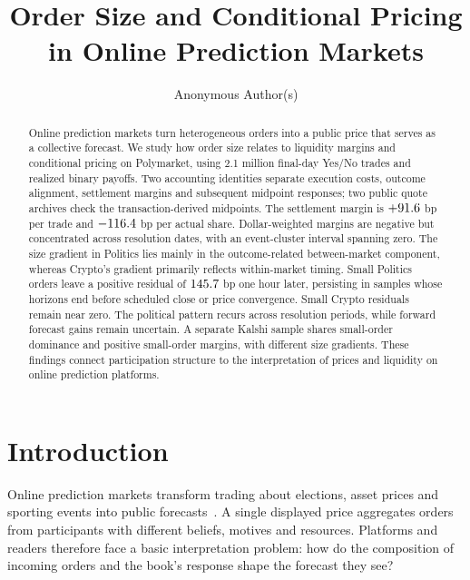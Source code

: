 \documentclass[sigconf,anonymous,nonacm,balance=false]{acmart}
\begin{document}
\title{Order Size and Conditional Pricing in Online Prediction Markets}
\author{Anonymous Author(s)}
\renewcommand{\shortauthors}{Anon.}

\begin{abstract}
Online prediction markets turn heterogeneous orders into a public price that serves as a collective forecast. We study how order size relates to liquidity margins and conditional pricing on Polymarket, using 2.1 million final-day Yes/No trades and realized binary payoffs. Two accounting identities separate execution costs, outcome alignment, settlement margins and subsequent midpoint responses; two public quote archives check the transaction-derived midpoints. The settlement margin is $+91.6$ bp per trade and $-116.4$ bp per actual share. Dollar-weighted margins are negative but concentrated across resolution dates, with an event-cluster interval spanning zero. The size gradient in Politics lies mainly in the outcome-related between-market component, whereas Crypto's gradient primarily reflects within-market timing. Small Politics orders leave a positive residual of $145.7$ bp one hour later, persisting in samples whose horizons end before scheduled close or price convergence. Small Crypto residuals remain near zero. The political pattern recurs across resolution periods, while forward forecast gains remain uncertain. A separate Kalshi sample shares small-order dominance and positive small-order margins, with different size gradients. These findings connect participation structure to the interpretation of prices and liquidity on online prediction platforms.

\end{abstract}

\maketitle

\section{Introduction}
Online prediction markets transform trading about elections, asset prices and sporting events into public forecasts~\cite{wolfers2004prediction,arrow2008promise}. A single displayed price aggregates orders from participants with different beliefs, motives and resources. Platforms and readers therefore face a basic interpretation problem: how do the composition of incoming orders and the book's response shape the forecast they see?
\end{document}
